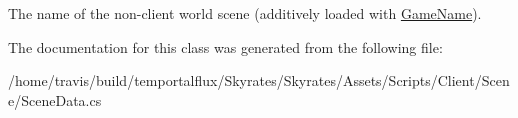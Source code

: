 The name of the non-\/client world scene (additively loaded with \hyperlink{class_skyrates_1_1_client_1_1_scene_1_1_scene_data_a48d1b49f072d6c1962ef98e479018d4d}{Game\-Name}). 



The documentation for this class was generated from the following file\-:\begin{DoxyCompactItemize}
\item 
/home/travis/build/temportalflux/\-Skyrates/\-Skyrates/\-Assets/\-Scripts/\-Client/\-Scene/Scene\-Data.\-cs\end{DoxyCompactItemize}
